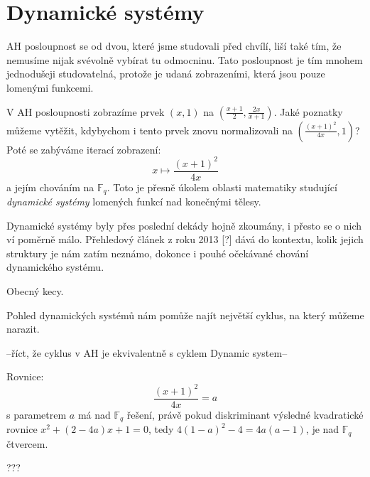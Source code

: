\documentclass[12pt]{report}
\begin{document}
\section{Dynamické systémy}

AH posloupnost se od dvou, které jsme studovali před chvílí, liší také tím, že nemusíme nijak svévolně vybírat tu  odmocninu. Tato posloupnost je tím mnohem jednodušeji studovatelná, protože je udaná zobrazeními, která jsou pouze lomenými funkcemi. 
  
V AH posloupnosti zobrazíme prvek $(x,1)$ na $\left(\frac{x+1}{2}, \frac{2x}{x+1}\right)$. Jaké poznatky můžeme vytěžit, kdybychom i tento prvek znovu normalizovali na $\left ( \frac{(x+1)^2}{4x}, 1 \right)$? Poté se zabýváme iterací zobrazení:
$$x \longmapsto \frac{(x+1)^2}{4x}$$
a jejím chováním na $\mathbb{F}_q$. Toto je přesně úkolem oblasti matematiky studující \textit{dynamické systémy} lomených funkcí nad konečnými tělesy.

Dynamické systémy byly přes poslední dekády hojně zkoumány, i přesto se o nich ví poměrně málo. Přehledový článek z roku 2013 [?] dává do kontextu, kolik jejich struktury je nám zatím neznámo, dokonce i pouhé očekávané chování dynamického systému. 




Obecný kecy.

Pohled dynamických systémů nám pomůže najít největší cyklus, na který můžeme narazit.

--říct, že cyklus v AH je ekvivalentně s cyklem Dynamic system--

Rovnice: $$\frac{(x+1)^2}{4x} = a$$ s parametrem $a$ má nad $\mathbb{F}_q$ řešení, právě pokud diskriminant výsledné kvadratické rovnice $x^2 + (2-4a)x+1=0$, tedy $4(1-a)^2-4 = 4a(a-1)$, je nad $\mathbb{F}_q$ čtvercem.

???


\end{document}

